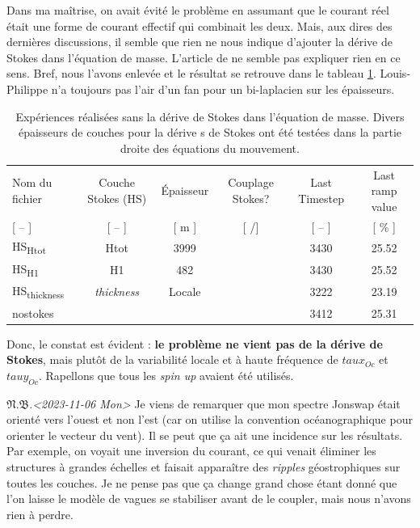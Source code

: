\documentclass[10pt]{article}
\numberwithin{equation}{section}
\newcommand{\pt}{\hspace{1pt}} %
\newcommand{\nb}{\underline{{\footnotesize\EightStarConvex}\pt $\mathfrak{N.B.}$\vphantom{p}}\hspace{3pt}}
\newcommand{\cmark}{\ding{52}}
\newcommand{\xmark}{\ding{55}}
\begin{document}
Dans ma maîtrise, on avait évité le problème en assumant que le courant réel était une forme de courant effectif qui combinait les deux.
Mais, aux dires des dernières discussions, il semble que rien ne nous indique d'ajouter la dérive de Stokes dans l'équation de masse.
L'article de \Textcite{suzuki2016understanding} ne semble pas expliquer rien en ce sens.
Bref, nous l'avons enlevée et le résultat se retrouve dans le tableau \ref{tab:org4261665}.
Louis-Philippe n'a toujours pas l'air d'un fan pour un bi-laplacien sur les épaisseurs.

\begin{table}[htbp]
\caption{\label{tab:org4261665}Expériences réalisées sans la dérive de Stokes dans l'équation de masse. Divers épaisseurs de couches pour la dérive s de Stokes ont été testées dans la partie droite des équations du mouvement.}
\centering
\begin{tabular}{lccccc}
\hline
\hline
Nom du fichier & Couche Stokes (HS) & Épaisseur & Couplage Stokes? & Last Timestep & Last ramp value\\
{[} -- ] & {[} -- ] & {[} m ] & {[} \cmark/\xmark ] & {[} -- ] & {[} \% ]\\
\hline
HS\textsubscript{Htot} & Htot & 3999 & \cmark & 3430 & 25.52\\
HS\textsubscript{H1} & H1 & 482 & \cmark & 3430 & 25.52\\
HS\textsubscript{thickness} & \emph{thickness} & Locale & \cmark & 3222 & 23.19\\
nostokes & \xmark & \xmark & \xmark & 3412 & 25.31\\
\hline
\end{tabular}
\end{table}

Donc, le constat est évident : \textbf{le problème ne vient pas de la dérive de Stokes}, mais plutôt de la variabilité locale et à haute fréquence de \(taux_{Oc}\) et \(tauy_{Oc}\).
Rapellons que tous les \emph{spin up} avaient été utilisés. \bigskip

\nb \textit{<2023-11-06 Mon> } Je viens de remarquer que mon spectre Jonswap était orienté vers l'ouest et non l'est (car on utilise la convention océanographique pour orienter le vecteur du vent).
Il se peut que ça ait une incidence sur les résultats.
Par exemple, on voyait une inversion du courant, ce qui venait éliminer les structures à grandes échelles et faisait apparaître des \emph{ripples} géostrophiques sur toutes les couches.
Je ne pense pas que ça change grand chose étant donné que l'on laisse le modèle de vagues se stabiliser avant de le coupler, mais nous n'avons rien à perdre. 
\end{document}
